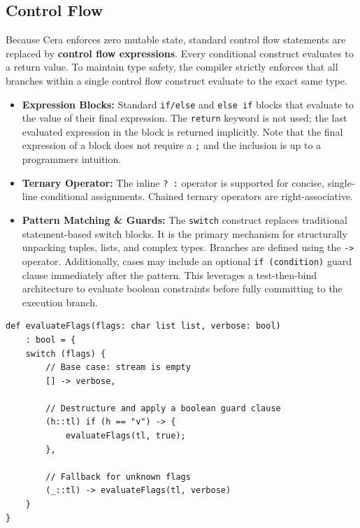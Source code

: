 \documentclass[11pt, a4paper]{article}
\begin{document}
\subsection{Control Flow}
\noindent
Because Cera enforces zero mutable state, standard control flow statements are replaced by \textbf{control flow expressions}. Every conditional construct evaluates to a return value. To maintain type safety, the compiler strictly enforces that all branches within a single control flow construct evaluate to the exact same type.

\begin{itemize}
    \item \textbf{Expression Blocks:} Standard \texttt{if/else} and \texttt{else if} blocks that evaluate to the value of their final expression. The \texttt{return} keyword is not used; the last evaluated expression in the block is returned implicitly. Note that the final expression of a block does not require a \texttt{;} and the inclusion is up to a programmers intuition.
    \item \textbf{Ternary Operator:} The inline \texttt{? :} operator is supported for concise, single-line conditional assignments. Chained ternary operators are right-associative.
\item \textbf{Pattern Matching \& Guards:} The \texttt{switch} construct replaces traditional statement-based switch blocks. It is the primary mechanism for structurally unpacking tuples, lists, and complex types. Branches are defined using the \texttt{->} operator. Additionally, cases may include an optional \texttt{if (condition)} guard clause immediately after the pattern. This leverages a test-then-bind architecture to evaluate boolean constraints before fully committing to the execution branch.
\end{itemize}

\begin{lstlisting}[language=Cera, title={Pattern Matching with Guards}, basicstyle=\ttfamily]
def evaluateFlags(flags: char list list, verbose: bool) 
    : bool = {
    switch (flags) {
        // Base case: stream is empty
        [] -> verbose,
        
        // Destructure and apply a boolean guard clause
        (h::tl) if (h == "v") -> {
            evaluateFlags(tl, true);
        },
        
        // Fallback for unknown flags
        (_::tl) -> evaluateFlags(tl, verbose)
    }
}
\end{lstlisting}
\end{document}
